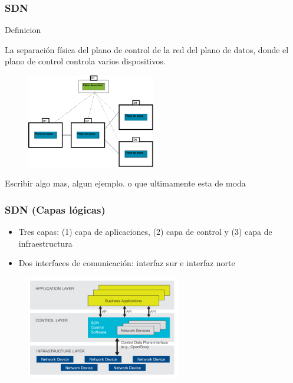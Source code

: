 \documentclass{beamer}
\begin{document}
\begin{frame}
\frametitle{SDN} 

\begin{block}{Definicion}

La separación física del plano de control de la red del plano de datos, donde el plano
de control controla varios dispositivos.

\end{block}

	\begin{figure}[H]
		\raggedright
		\includegraphics[width=0.5\textwidth, center]{imagenes/SDN-distribuido.png}
	\end{figure}

Escribir algo mas, algun ejemplo. o que ultimamente esta de moda

\end{frame}

\begin{frame}
\frametitle{SDN (Capas l\'ogicas)} 

\begin{itemize}
\item Tres capas: (1) capa de aplicaciones, (2) capa de control y (3) capa de infraestructura
\item Dos interfaces de comunicaci\'on: interfaz sur e interfaz norte
\end{itemize}
 

\begin{figure}[H]
\centering
\includegraphics[width=0.6\textwidth]{imagenes/SDNArchitecture.png}
\end{figure}
\end{frame}
\end{document}
